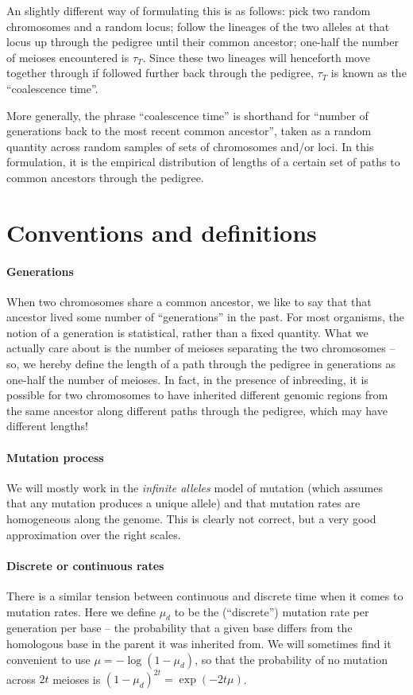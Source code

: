 An slightly different way of formulating this is as follows:
pick two random chromosomes and a random locus;
follow the lineages of the two alleles at that locus up through the pedigree
until their common ancestor;
one-half the number of meioses encountered is $\tau_T$.
Since these two lineages will henceforth move together through if followed further back through the pedigree,
$\tau_T$ is known as the ``coalescence time''.

More generally, the phrase ``coalescence time'' is shorthand
for ``number of generations back to the most recent common ancestor'',
taken as a random quantity across random samples of sets of chromosomes and/or loci.
In this formulation, it is the empirical distribution of lengths of a certain set of paths 
to common ancestors through the pedigree.


\section{Conventions and definitions}

\paragraph{Generations}
  When two chromosomes share a common ancestor, we like to say that that ancestor lived some number of ``generations'' in the past.
  For most organisms, the notion of a generation is statistical, rather than a fixed quantity.
  What we actually care about is the number of meioses separating the two chromosomes --
  so, we hereby define the length of a path through the pedigree in generations as one-half the number of meioses.
  In fact, in the presence of inbreeding, it is possible for two chromosomes to have inherited different genomic regions
  from the same ancestor along different paths through the pedigree, which may have different lengths!

\paragraph{Mutation process}
  We will mostly work in the \emph{infinite alleles} model of mutation
  (which assumes that any mutation produces a unique allele)
  and that mutation rates are homogeneous along the genome.
  This is clearly not correct, but a very good approximation over the right scales.


\paragraph{Discrete or continuous rates}
  There is a similar tension between continuous and discrete time when it comes to mutation rates.
  Here we define $\mu_d$ to be the (``discrete'') mutation rate per generation per base 
  -- the probability that a given base differs from the homologous base in the parent it was inherited from.
  We will sometimes find it convenient to use $\mu = -\log(1-\mu_d)$,
  so that the probability of no mutation across $2t$ meioses is $(1-\mu_d)^{2t} = \exp(-2 t \mu )$.


